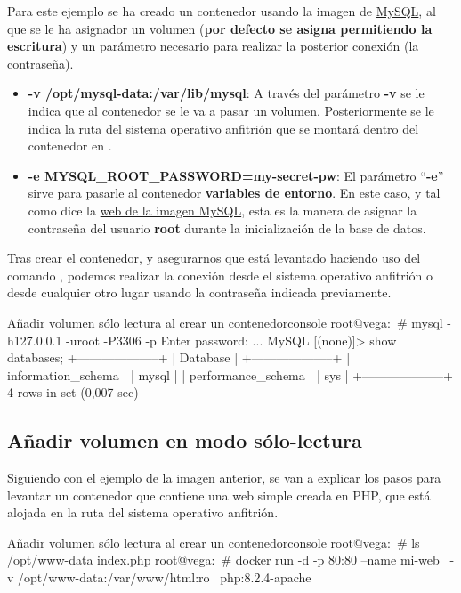Para este ejemplo se ha creado un contenedor usando la imagen de \href{https://hub.docker.com/_/mysql}{MySQL}, al que se le ha asignador un volumen (\textbf{por defecto se asigna permitiendo la escritura}) y un parámetro necesario para realizar la posterior conexión (la contraseña).

\begin{itemize}
    \item \textbf{-v /opt/mysql-data:/var/lib/mysql}: A través del parámetro \textbf{-v} se le indica que al contenedor se le va a pasar un volumen. Posteriormente se le indica la ruta del sistema operativo anfitrión  que se montará dentro del contenedor en .
    \item \textbf{-e MYSQL\_ROOT\_PASSWORD=my-secret-pw}: El parámetro “\textbf{-e}” sirve para pasarle al contenedor \textbf{variables de entorno}. En este caso, y tal como dice la \href{https://hub.docker.com/_/mysql}{web de la imagen MySQL}, esta es la manera de asignar la contraseña del usuario \textbf{root} durante la inicialización de la base de datos.
\end{itemize}

Tras crear el contenedor, y asegurarnos que está levantado haciendo uso del comando , podemos realizar la conexión desde el sistema operativo anfitrión o desde cualquier otro lugar usando la contraseña indicada previamente.

\begin{mycode}{Añadir volumen sólo lectura al crear un contenedor}{console}{{\small }}
root@vega:~# mysql -h127.0.0.1 -uroot -P3306 -p
    Enter password:
    ...
    MySQL [(none)]> show databases;
    +--------------------+
    | Database           |
    +--------------------+
    | information_schema |
    | mysql              |
    | performance_schema |
    | sys                |
    +--------------------+
    4 rows in set (0,007 sec)
\end{mycode}

\subsection{Añadir volumen en modo sólo-lectura}
Siguiendo con el ejemplo de la imagen anterior, se van a explicar los pasos para levantar un contenedor que contiene una web simple creada en PHP, que está alojada en la ruta  del sistema operativo anfitrión.


\begin{mycode}{Añadir volumen sólo lectura al crear un contenedor}{console}{}
root@vega:~# ls /opt/www-data
index.php
root@vega:~# docker run -d -p 80:80 --name mi-web \
    -v /opt/www-data:/var/www/html:ro \
    php:8.2.4-apache
\end{mycode}

